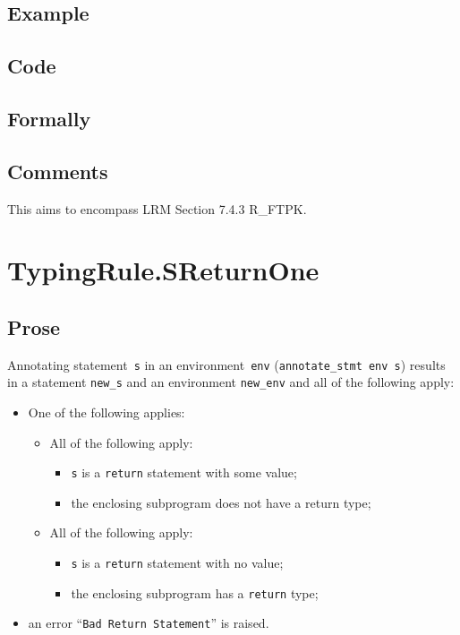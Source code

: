 \documentclass{book}
\begin{document}
  \subsection{Example}

  \subsection{Code}

\begin{emptyformal}
    \subsection{Formally}
\end{emptyformal}

\subsection{Comments}
    This aims to encompass LRM Section 7.4.3 R\_FTPK.


\section{TypingRule.SReturnOne \label{sec:TypingRule.SReturnOne}}

  \subsection{Prose}
Annotating statement~\texttt{s} in an environment~\texttt{env}
(\texttt{annotate\_stmt env s}) results in a statement \texttt{new\_s} and an
environment \texttt{new\_env} and all of the following apply:
   \begin{itemize}
   \item One of the following applies:
     \begin{itemize}
     \item All of the following apply:
       \begin{itemize}
       \item \texttt{s} is a \texttt{return} statement with some value;
       \item the enclosing subprogram does not have a return type;
       \end{itemize}
     \item All of the following apply:
       \begin{itemize}
       \item \texttt{s} is a \texttt{return} statement with no value;
       \item the enclosing subprogram has a \texttt{return} type;
       \end{itemize}
     \end{itemize}
   \item an error ``\texttt{Bad Return Statement}'' is raised.
   \end{itemize}
\end{document}
